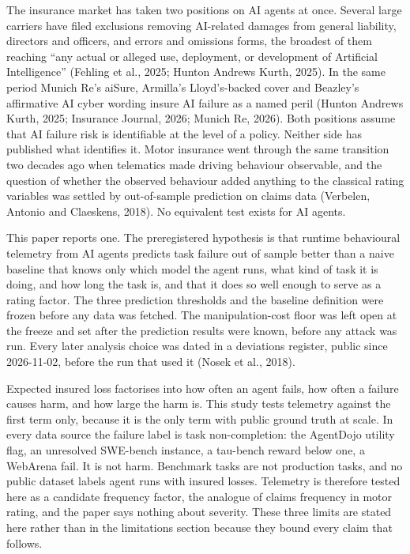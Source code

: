 \documentclass[
  11pt,
  a4paper,
]{article}
\begin{document}
The insurance market has taken two positions on AI agents at once.
Several large carriers have filed exclusions removing AI-related damages
from general liability, directors and officers, and errors and omissions
forms, the broadest of them reaching ``any actual or alleged use,
deployment, or development of Artificial Intelligence'' (Fehling et al.,
2025; Hunton Andrews Kurth, 2025). In the same period Munich Re's
aiSure, Armilla's Lloyd's-backed cover and Beazley's affirmative AI
cyber wording insure AI failure as a named peril (Hunton Andrews Kurth,
2025; Insurance Journal, 2026; Munich Re, 2026). Both positions assume
that AI failure risk is identifiable at the level of a policy. Neither
side has published what identifies it. Motor insurance went through the
same transition two decades ago when telematics made driving behaviour
observable, and the question of whether the observed behaviour added
anything to the classical rating variables was settled by out-of-sample
prediction on claims data (Verbelen, Antonio and Claeskens, 2018). No
equivalent test exists for AI agents.

This paper reports one. The preregistered hypothesis is that runtime
behavioural telemetry from AI agents predicts task failure out of sample
better than a naive baseline that knows only which model the agent runs,
what kind of task it is doing, and how long the task is, and that it
does so well enough to serve as a rating factor. The three prediction
thresholds and the baseline definition were frozen before any data was
fetched. The manipulation-cost floor was left open at the freeze and set
after the prediction results were known, before any attack was run.
Every later analysis choice was dated in a deviations register, public
since 2026-11-02, before the run that used it (Nosek et al., 2018).

Expected insured loss factorises into how often an agent fails, how
often a failure causes harm, and how large the harm is. This study tests
telemetry against the first term only, because it is the only term with
public ground truth at scale. In every data source the failure label is
task non-completion: the AgentDojo utility flag, an unresolved SWE-bench
instance, a tau-bench reward below one, a WebArena fail. It is not harm.
Benchmark tasks are not production tasks, and no public dataset labels
agent runs with insured losses. Telemetry is therefore tested here as a
candidate frequency factor, the analogue of claims frequency in motor
rating, and the paper says nothing about severity. These three limits
are stated here rather than in the limitations section because they
bound every claim that follows.
\end{document}
